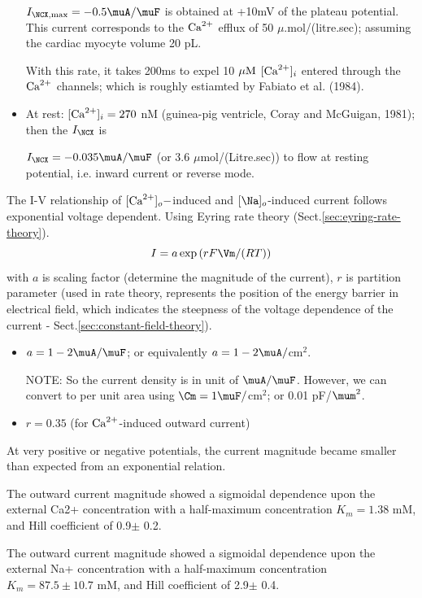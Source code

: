\begin{itemize}
    $I_{\NCX,\max} = -0.5 \muA/\muF$ is obtained at +10mV of the plateau
    potential. This current corresponds to the ${\text{Ca}^{2+}}$ efflux of 50
    $\mu.$mol/(litre.sec); assuming the cardiac myocyte volume 20 pL. 
    
    With this rate, it takes 200ms to expel 10 ${\mu\text{M}}$ $[{\text{Ca}^{2+}}]_i$ entered through
    the ${\text{Ca}^{2+}}$ channels; which is roughly estiamted by Fabiato et al. (1984).
   
   \item At rest: $[{\text{Ca}^{2+}}]_i = 270$ nM (guinea-pig ventricle, Coray and McGuigan,
   1981); then the $I_\NCX$ is 
   
   $I_\NCX = -0.035 \muA/\muF$ (or 3.6 $\mu$mol/(Litre.sec)) to flow at resting
   potential, i.e. inward current or reverse mode.

\end{itemize}

The I-V relationship of $[{\text{Ca}^{2+}}]_o-$induced and $[\Na]_o$-induced current follows
exponential voltage dependent. Using Eyring rate theory
(Sect.\ref{sec:eyring-rate-theory}).
\begin{equation}
I = a \exp \left(  r F \Vm / (RT) \right)
\end{equation}
with $a$ is scaling factor (determine the magnitude of the current),
$r$ is partition parameter (used in rate theory, represents the
position of the energy barrier in electrical field, which indicates the steepness of
the voltage dependence of the current - Sect.\ref{sec:constant-field-theory}).
\begin{itemize}
  \item $a = 1 - 2	 \muA/\muF$; or equivalently $a = 1-2 \muA/$cm$^2$.
  
NOTE: So the current density is in unit of $\muA/\muF$. However, we can convert
to per unit area using $\Cm=1\muF/$cm$^2$; or 0.01 pF/$\mum^2$.
  
  \item $r = 0.35$ (for ${\text{Ca}^{2+}}$-induced outward current)
\end{itemize}
At very positive or negative potentials, the current magnitude became smaller than
expected from an exponential relation.


The outward current magnitude showed a sigmoidal dependence upon the
external Ca2+ concentration with a half-maximum concentration $K_m = 1.38$ mM,
and Hill coefficient of 0.9$\pm$ 0.2.


The outward current magnitude showed a sigmoidal dependence upon the
external Na+ concentration with a half-maximum concentration $K_m = 87.5\pm
10.7$ mM, and Hill coefficient of 2.9$\pm$ 0.4.



